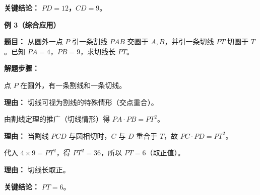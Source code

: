 \begin{examplebox}
	\textbf{\textcolor{CExample}{关键结论：}}
	\textbf{$PD = 12$，$CD = 9$}。

	\medskip
	\textbf{\textcolor{CExample}{例 3（综合应用）}}

	\textbf{\textcolor{CExample}{题目：}}
	从圆外一点 $P$ 引一条割线 $PAB$ 交圆于 $A,B$，并引一条切线 $PT$ 切圆于 $T$。已知 $PA=4$，$PB=9$，求切线长 $PT$。

	\textbf{\textcolor{CExample}{解题步骤：}}
	\begin{description}[style=nextline, leftmargin=2.8em, labelsep=0.5em, itemsep=0.45em]
		\item[\textbf{第一步（识别条件）：}] 点 $P$ 在圆外，有一条割线和一条切线。
			\par\textbf{理由：}
			切线可视为割线的特殊情形（交点重合）。
		\item[\textbf{第二步（套用推广）：}] 由割线定理的推广（切线情形）得 $PA \cdot PB = PT^2$。
			\par\textbf{理由：}
			当割线 $PCD$ 与圆相切时，$C$ 与 $D$ 重合于 $T$，故 $PC \cdot PD = PT^2$。
		\item[\textbf{第三步（计算求解）：}] 代入 $4 \times 9 = PT^2$，得 $PT^2 = 36$，所以 $PT = 6$（取正值）。
			\par\textbf{理由：}
			切线长取正。
	\end{description}

	\textbf{\textcolor{CExample}{关键结论：}}
	\textbf{$PT = 6$}。
\end{examplebox}
